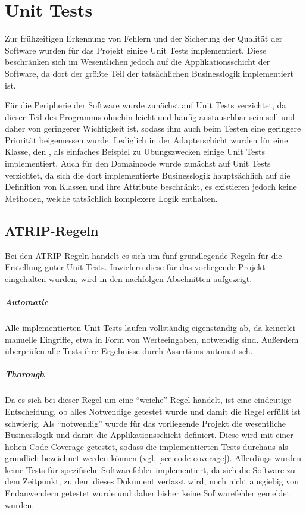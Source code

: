 \chapter{Unit Tests}
Zur frühzeitigen Erkennung von Fehlern und der Sicherung der Qualität der Software wurden für das Projekt einige Unit Tests implementiert. Diese beschränken sich im Wesentlichen jedoch auf die Applikationsschicht der Software, da dort der größte Teil der tatsächlichen Businesslogik implementiert ist. 

Für die Peripherie der Software wurde zunächst auf Unit Tests verzichtet, da dieser Teil des Programms ohnehin leicht und häufig austauschbar sein soll und daher von geringerer Wichtigkeit ist, sodass ihm auch beim Testen eine geringere Priorität beigemessen wurde. Lediglich in der Adapterschicht wurden für eine Klasse, den , als einfaches Beispiel zu Übungszwecken einige Unit Tests implementiert. Auch für den Domaincode wurde zunächst auf Unit Tests verzichtet, da sich die dort implementierte Businesslogik hauptsächlich auf die Definition von Klassen und ihre Attribute beschränkt, es existieren jedoch keine Methoden, welche tatsächlich komplexere Logik enthalten.

\section{ATRIP-Regeln}
Bei den ATRIP-Regeln handelt es sich um fünf grundlegende Regeln für die Erstellung guter Unit Tests. Inwiefern diese für das vorliegende Projekt eingehalten wurden, wird in den nachfolgen Abschnitten aufgezeigt.

\paragraph{Automatic} Alle implementierten Unit Tests laufen vollständig eigenständig ab, da keinerlei manuelle Eingriffe, etwa in Form von Werteeingaben, notwendig sind. Außerdem überprüfen alle Tests ihre Ergebnisse durch Assertions automatisch.

\paragraph{Thorough} Da es sich bei dieser Regel um eine \enquote{weiche} Regel handelt, ist eine eindeutige Entscheidung, ob alles Notwendige getestet wurde und damit die Regel erfüllt ist schwierig. Als \enquote{notwendig} wurde für das vorliegende Projekt die wesentliche Businesslogik und damit die Applikationsschicht definiert. Diese wird mit einer hohen Code-Coverage getestet, sodass die implementierten Tests durchaus als gründlich bezeichnet werden können (vgl. \autoref{sec:code-coverage}). Allerdings wurden keine Tests für spezifische Softwarefehler implementiert, da sich die Software zu dem Zeitpunkt, zu dem dieses Dokument verfasst wird, noch nicht ausgiebig von Endanwendern getestet wurde und daher bisher keine Softwarefehler gemeldet wurden.

